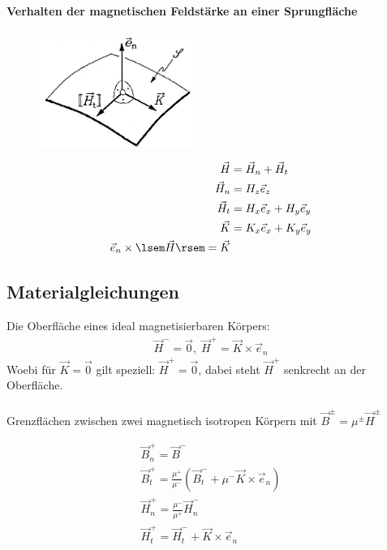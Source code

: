\documentclass[12pt]{article}
\begin{document}
\paragraph{Verhalten der magnetischen Feldstärke an einer Sprungfläche} %
\begin{figure}
\centering
\includegraphics[width=5cm]{pic/abb19-3x2nr}
\end{figure}

\begin{align}
\vec{H} &= \vec{H}_n + \vec{H}_t\\
\vec{H}_n &= H_z \vec{e}_z \\
\vec{H}_t &= H_x \vec{e}_x + H_y \vec{e}_y \\
\vec{K} &= K_x \vec{e}_x + K_y \vec{e}_y \\
\vec{e}_n \times \lsem \vec{H} \rsem = \vec{K}
\end{align}
\newpage
\subsection{Materialgleichungen}
Die Oberfläche eines ideal magnetisierbaren Körpers: 
\begin{align}
\vec{H}^- = \vec{0},\; \vec{H}^+=\vec{K}\times \vec{e}_n
\end{align}
Woebi für \(\vec{K} = \vec{0}\) gilt speziell: \(\vec{H}^+ = \vec{0}\), dabei steht \(\vec{H}^+\) senkrecht an der Oberfläche. \\
\noindent \\
Grenzflächen zwischen zwei magnetisch isotropen Körpern mit \(\vec{B}^\pm = \mu^\pm \vec{H}^\pm\) 

\begin{align}
\vec{B}_n^+ = \vec{B}^- \\
\vec{B}^+_t = \frac{\mu^+}{\mu^-}\left( \vec{B}^-_t + \mu^- \vec{K} \times \vec{e}_n \right)\\
\vec{H}_n^+ = \frac{\mu^-}{\mu^+}\vec{H}_n^-\\
\vec{H}_t^+ = \vec{H}_t^- + \vec{K} \times \vec{e}_n
\end{align}
\newpage 

\end{document}
